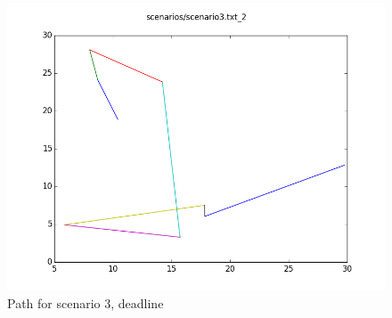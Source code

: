 \documentclass[paper=a4, fontsize=11pt]{scrartcl} %
\numberwithin{equation}{section} %
\numberwithin{figure}{section} %
\numberwithin{table}{section} %
\begin{document}
\begin{figure}[H]
	\centering
  \includegraphics[width=1\textwidth]{results/3_2.png}
	\caption{Path for scenario 3, deadline}
\end{figure}
\end{document}
